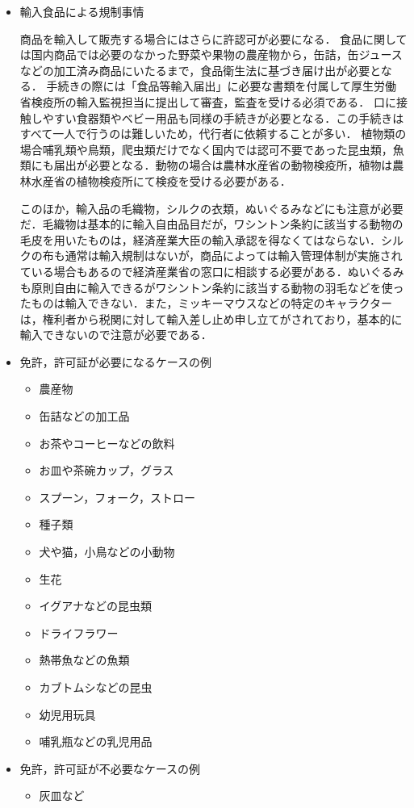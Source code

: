 \begin{itemize}
 \item	輸入食品による規制事情

商品を輸入して販売する場合にはさらに許認可が必要になる．
食品に関しては国内商品では必要のなかった野菜や果物の農産物から，缶詰，缶ジュースなどの加工済み商品にいたるまで，食品衛生法に基づき届け出が必要となる．
手続きの際には「食品等輸入届出」に必要な書類を付属して厚生労働省検疫所の輸入監視担当に提出して審査，監査を受ける必須である．
口に接触しやすい食器類やベビー用品も同様の手続きが必要となる．この手続きはすべて一人で行うのは難しいため，代行者に依頼することが多い．
植物類の場合哺乳類や鳥類，爬虫類だけでなく国内では認可不要であった昆虫類，魚類にも届出が必要となる．動物の場合は農林水産省の動物検疫所，植物は農林水産省の植物検疫所にて検疫を受ける必要がある．

このほか，輸入品の毛織物，シルクの衣類，ぬいぐるみなどにも注意が必要だ．毛織物は基本的に輸入自由品目だが，ワシントン条約に該当する動物の毛皮を用いたものは，経済産業大臣の輸入承認を得なくてはならない．シルクの布も通常は輸入規制はないが，商品によっては輸入管理体制が実施されている場合もあるので経済産業省の窓口に相談する必要がある．ぬいぐるみも原則自由に輸入できるがワシントン条約に該当する動物の羽毛などを使ったものは輸入できない．また，ミッキーマウスなどの特定のキャラクターは，権利者から税関に対して輸入差し止め申し立てがされており，基本的に輸入できないので注意が必要である．



 \item	免許，許可証が必要になるケースの例
\begin{itemize}
\setlength{\parskip}{3mm}
 \item	農産物
 \item	缶詰などの加工品
 \item	お茶やコーヒーなどの飲料
 \item	お皿や茶碗カップ，グラス
 \item	スプーン，フォーク，ストロー
 \item	種子類
 \item	犬や猫，小鳥などの小動物
 \item	生花
 \item	イグアナなどの昆虫類
 \item	ドライフラワー
 \item	熱帯魚などの魚類
 \item	カブトムシなどの昆虫
 \item	幼児用玩具
 \item	哺乳瓶などの乳児用品
\end{itemize}



 \item	免許，許可証が不必要なケースの例
\begin{itemize}
\setlength{\parskip}{3mm}
 \item	灰皿など

\end{itemize}
\end{itemize}




